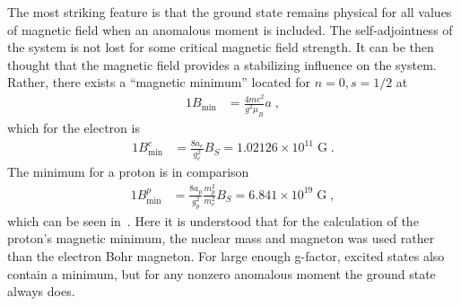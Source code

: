 The most striking feature is that the ground state remains physical for all values of magnetic field when an anomalous moment is included. The self-adjointness of the system is not lost for some critical magnetic field strength. It can be then thought that the magnetic field provides a stabilizing influence on the system. Rather, there exists a ``magnetic minimum'' located for $n=0, s=1/2$ at
\begin{alignat}{1}
\label{IKGP06} B_{\mathrm{min}}&=\frac{4mc^{2}}{g^{2}\mu_{B}}a\;,
\end{alignat}
which for the electron is
\begin{alignat}{1}
B_{\mathrm{min}}^{e}&=\frac{8a_e}{g_e^2}B_{S}
=1.02126\times10^{11}\;\mathrm{G}\;.
\end{alignat}
The minimum for a proton is in comparison
\begin{alignat}{1}
B_{\mathrm{min}}^{p}&=\frac{8a_p}{g_p^2} \frac{m_p^2}{m_e^2}B_{S}
=6.841\times10^{19}\;\mathrm{G}\;,
\end{alignat}
which can be seen in~. Here it is understood that for the calculation of the proton's magnetic minimum, the nuclear mass and magneton was used rather than the electron Bohr magneton. For large enough g-factor, excited states also contain a minimum, but for any nonzero anomalous moment the ground state always does.

